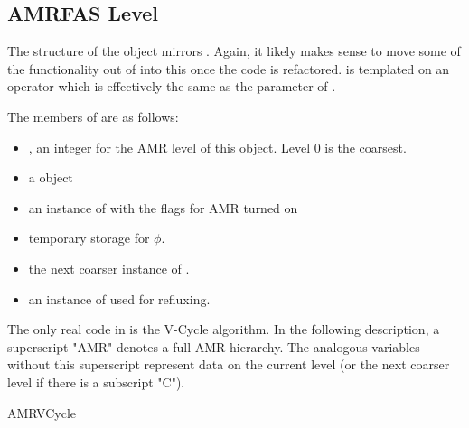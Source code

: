 \documentclass[12pt,a4paper]{article}
\begin{document}
\subsection{AMRFAS Level}

The structure of the  object mirrors . Again, it likely makes sense to move some of the functionality out of  into this  once the code is refactored.  is templated on an operator  which is effectively the same as the  parameter of .

The members of  are as follows:

\begin{itemize}
\item {}, an integer for the AMR level of this object. Level 0 is the coarsest. 
\item {} a  object
\item {} an instance of  with the flags for AMR turned on
\item {} temporary storage for $\phi$.
\item {} the next coarser instance of .
\item {} an instance of  used for refluxing.  
\end{itemize}

The only real code in  is the V-Cycle algorithm. In the following description, a superscript "AMR" denotes a full AMR hierarchy. The analogous variables without this superscript represent data on the current level (or the next coarser level if there is a subscript "C").

\begin{algorithm}
\caption{AMRVCycle}
\begin{algorithmic}[1]
\Else
	  
	  
	 \EndIf
	  
\EndIf
{}
\EndProcedure
\end{algorithmic}
\end{algorithm}
\end{document}
